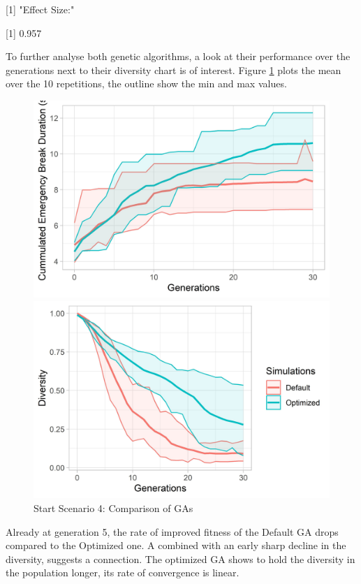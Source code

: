 [1] "Effect Size:"

[1] 0.957

To further analyse both genetic algorithms, a look at their performance over the generations next to their diversity chart is of interest. Figure \ref{figure:sim_4_ga_comparison} plots the mean over the 10 repetitions, the outline show the min and max values.

\begin{figure}[ht] 
	\label{figure:sim_4_ga_comparison}
	\begin{minipage}[b]{0.5\linewidth}
		\centering
		\includegraphics[width=1\linewidth]{simulations/evaluation/plots/sim_4_ga_generations} 
	\end{minipage}%
	\begin{minipage}[b]{0.5\linewidth}
		\centering
		\includegraphics[width=1\linewidth]{simulations/evaluation/plots/sim_4_ga_diversity} 
	\end{minipage} 
	\caption{Start Scenario 4: Comparison of GAs}
\end{figure}


Already at generation 5, the rate of improved fitness of the Default GA drops compared to the Optimized one. A combined with an early sharp decline in the diversity, suggests a connection. The optimized GA shows to hold the diversity in the population longer, its rate of convergence is linear.